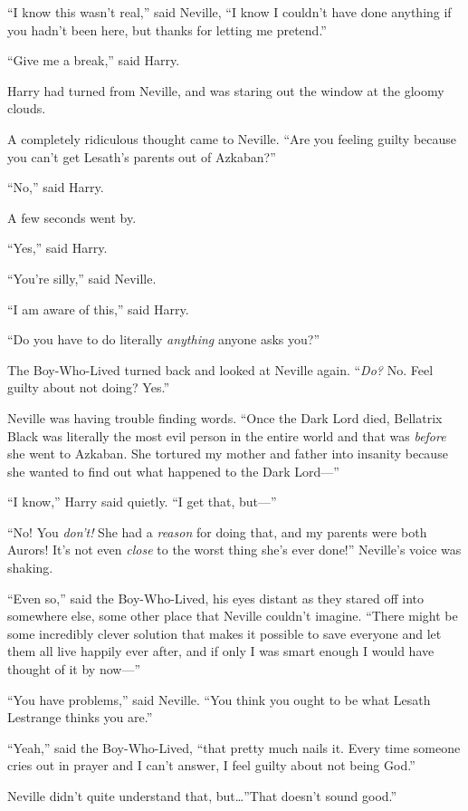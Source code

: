“I know this wasn’t real,” said Neville, “I know I couldn’t have done anything
if you hadn’t been here, but thanks for letting me pretend.”

“Give me a break,” said Harry.

Harry had turned from Neville, and was staring out the window at the gloomy
clouds.

A completely ridiculous thought came to Neville. “Are you feeling guilty
because you can’t get Lesath’s parents out of Azkaban?”

“No,” said Harry.

A few seconds went by.

“Yes,” said Harry.

“You’re silly,” said Neville.

“I am aware of this,” said Harry.

“Do you have to do literally \emph{anything} anyone asks you?”

The Boy-Who-Lived turned back and looked at Neville again. “\emph{Do?} No. Feel
guilty about not doing? Yes.”

Neville was having trouble finding words. “Once the Dark Lord died, Bellatrix
Black was literally the most evil person in the entire world and that was
\emph{before} she went to Azkaban. She tortured my mother and father into
insanity because she wanted to find out what happened to the Dark Lord—”

“I know,” Harry said quietly. “I get that, but—”

“No! You \emph{don’t!} She had a \emph{reason} for doing that, and my parents
were both Aurors! It’s not even \emph{close} to the worst thing she’s ever
done!” Neville’s voice was shaking.

“Even so,” said the Boy-Who-Lived, his eyes distant as they stared off into
somewhere else, some other place that Neville couldn’t imagine. “There might be
some incredibly clever solution that makes it possible to save everyone and let
them all live happily ever after, and if only I was smart enough I would have
thought of it by now—”

“You have problems,” said Neville. “You think you ought to be what Lesath
Lestrange thinks you are.”

“Yeah,” said the Boy-Who-Lived, “that pretty much nails it. Every time someone
cries out in prayer and I can’t answer, I feel guilty about not being God.”

Neville didn’t quite understand that, but…”That doesn’t sound good.”

